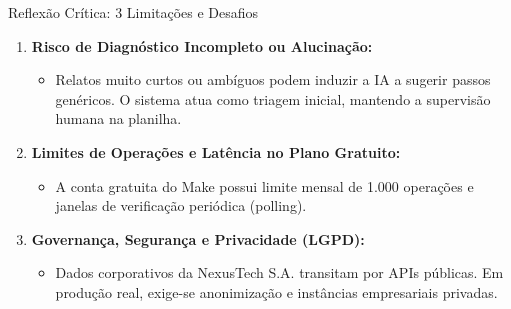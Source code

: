 \documentclass[aspectratio=169, 10pt]{beamer}
\begin{document}
\begin{frame}{Reflexão Crítica: 3 Limitações e Desafios}
    \begin{enumerate}
        \item \textbf{Risco de Diagnóstico Incompleto ou Alucinação:}
        \begin{itemize}
            \item Relatos muito curtos ou ambíguos podem induzir a IA a sugerir passos genéricos. O sistema atua como triagem inicial, mantendo a supervisão humana na planilha.
        \end{itemize}
        \vspace{0.2cm}
        \item \textbf{Limites de Operações e Latência no Plano Gratuito:}
        \begin{itemize}
            \item A conta gratuita do Make possui limite mensal de 1.000 operações e janelas de verificação periódica (polling).
        \end{itemize}
        \vspace{0.2cm}
        \item \textbf{Governança, Segurança e Privacidade (LGPD):}
        \begin{itemize}
            \item Dados corporativos da NexusTech S.A. transitam por APIs públicas. Em produção real, exige-se anonimização e instâncias empresariais privadas.
        \end{itemize}
    \end{enumerate}
\end{frame}
\end{document}
